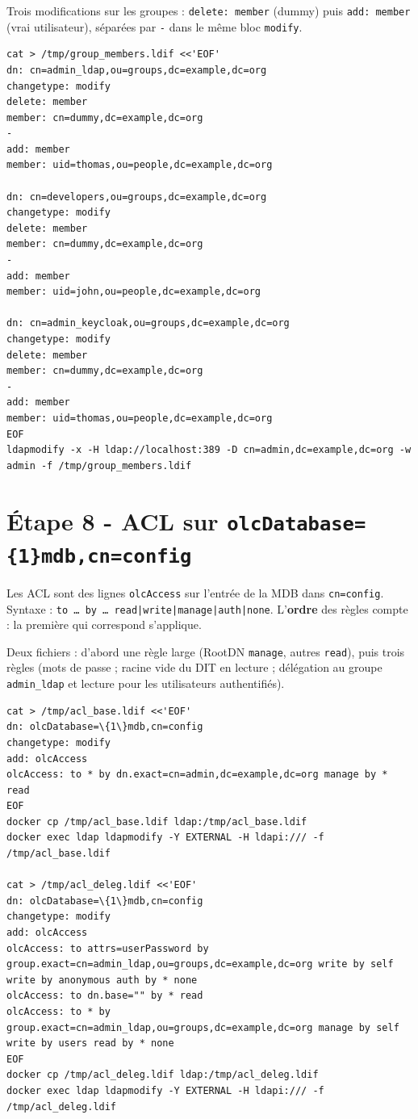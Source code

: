 \documentclass[11pt,a4paper]{report}
\begin{document}
Trois modifications sur les groupes : \texttt{delete: member} (dummy) puis \texttt{add: member} (vrai utilisateur), séparées par \texttt{-} dans le même bloc \texttt{modify}.

\begin{lstlisting}[style=bashstyle]
cat > /tmp/group_members.ldif <<'EOF'
dn: cn=admin_ldap,ou=groups,dc=example,dc=org
changetype: modify
delete: member
member: cn=dummy,dc=example,dc=org
-
add: member
member: uid=thomas,ou=people,dc=example,dc=org

dn: cn=developers,ou=groups,dc=example,dc=org
changetype: modify
delete: member
member: cn=dummy,dc=example,dc=org
-
add: member
member: uid=john,ou=people,dc=example,dc=org

dn: cn=admin_keycloak,ou=groups,dc=example,dc=org
changetype: modify
delete: member
member: cn=dummy,dc=example,dc=org
-
add: member
member: uid=thomas,ou=people,dc=example,dc=org
EOF
ldapmodify -x -H ldap://localhost:389 -D cn=admin,dc=example,dc=org -w admin -f /tmp/group_members.ldif
\end{lstlisting}

\section{Étape 8 - ACL sur \texttt{olcDatabase=\{1\}mdb,cn=config}}

Les ACL sont des lignes \texttt{olcAccess} sur l'entrée de la MDB dans \texttt{cn=config}. Syntaxe : \texttt{to \dots\ by \dots\ read|write|manage|auth|none}. L'\textbf{ordre} des règles compte : la première qui correspond s'applique.

Deux fichiers : d'abord une règle large (RootDN \texttt{manage}, autres \texttt{read}), puis trois règles (mots de passe ; racine vide du DIT en lecture ; délégation au groupe \texttt{admin\_ldap} et lecture pour les utilisateurs authentifiés).

\begin{lstlisting}[style=bashstyle]
cat > /tmp/acl_base.ldif <<'EOF'
dn: olcDatabase=\{1\}mdb,cn=config
changetype: modify
add: olcAccess
olcAccess: to * by dn.exact=cn=admin,dc=example,dc=org manage by * read
EOF
docker cp /tmp/acl_base.ldif ldap:/tmp/acl_base.ldif
docker exec ldap ldapmodify -Y EXTERNAL -H ldapi:/// -f /tmp/acl_base.ldif

cat > /tmp/acl_deleg.ldif <<'EOF'
dn: olcDatabase=\{1\}mdb,cn=config
changetype: modify
add: olcAccess
olcAccess: to attrs=userPassword by group.exact=cn=admin_ldap,ou=groups,dc=example,dc=org write by self write by anonymous auth by * none
olcAccess: to dn.base="" by * read
olcAccess: to * by group.exact=cn=admin_ldap,ou=groups,dc=example,dc=org manage by self write by users read by * none
EOF
docker cp /tmp/acl_deleg.ldif ldap:/tmp/acl_deleg.ldif
docker exec ldap ldapmodify -Y EXTERNAL -H ldapi:/// -f /tmp/acl_deleg.ldif
\end{lstlisting}
\end{document}
